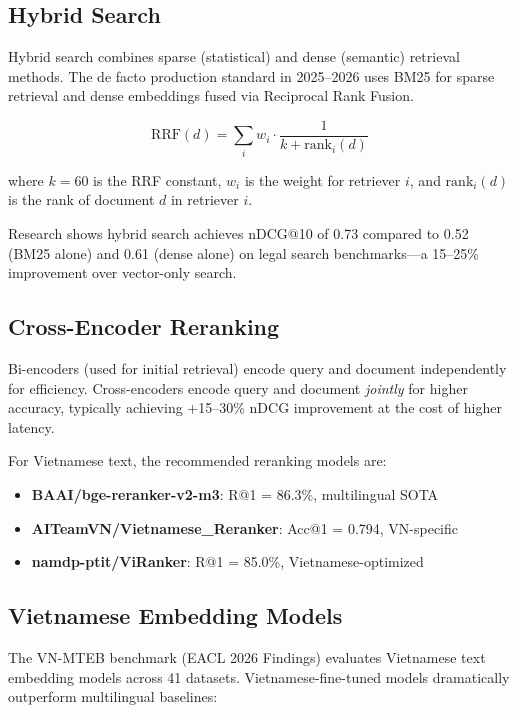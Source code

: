 \documentclass[12pt,a4paper]{article}
\begin{document}
\subsection{Hybrid Search}

Hybrid search combines sparse (statistical) and dense (semantic) retrieval
methods. The de facto production standard in 2025--2026 uses BM25 for
sparse retrieval and dense embeddings fused via Reciprocal Rank Fusion.

\begin{equation}
    \text{RRF}(d) = \sum_{i} w_i \cdot \frac{1}{k + \text{rank}_i(d)}
\end{equation}

where $k=60$ is the RRF constant, $w_i$ is the weight for retriever $i$,
and $\text{rank}_i(d)$ is the rank of document $d$ in retriever $i$.

Research shows hybrid search achieves nDCG@10 of 0.73 compared to 0.52
(BM25 alone) and 0.61 (dense alone) on legal search benchmarks---a 15--25\%
improvement over vector-only search.

\subsection{Cross-Encoder Reranking}

Bi-encoders (used for initial retrieval) encode query and document
independently for efficiency. Cross-encoders encode query and document
\textit{jointly} for higher accuracy, typically achieving +15--30\% nDCG
improvement at the cost of higher latency.

For Vietnamese text, the recommended reranking models are:
\begin{itemize}
    \item \textbf{BAAI/bge-reranker-v2-m3}: R@1 = 86.3\%, multilingual SOTA
    \item \textbf{AITeamVN/Vietnamese\_Reranker}: Acc@1 = 0.794, VN-specific
    \item \textbf{namdp-ptit/ViRanker}: R@1 = 85.0\%, Vietnamese-optimized
\end{itemize}

\subsection{Vietnamese Embedding Models}

The VN-MTEB benchmark (EACL 2026 Findings) evaluates Vietnamese text embedding
models across 41 datasets. Vietnamese-fine-tuned models dramatically outperform
multilingual baselines:
\end{document}
